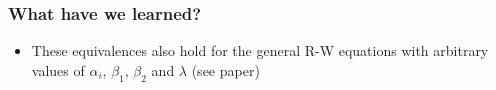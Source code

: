 \begin{frame}[c]
  \frametitle{What have we learned?}

  \begin{center}\Large
    \setlength{\fboxrule}{2pt}
  \end{center}
  \begin{itemize}
  \item[\hand] These equivalences also hold for the general R-W equations with arbitrary values of $\alpha_i$, $\beta_1$, $\beta_2$ and $\lambda$ (see paper)
  \end{itemize}
  
\end{frame}

